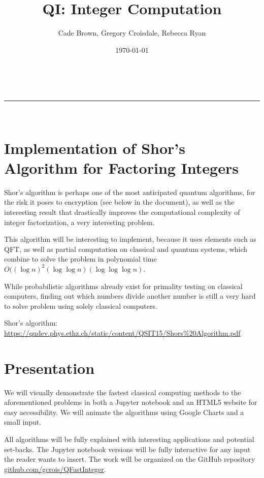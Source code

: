 \documentclass[a4paper,11pt]{article}
\makeatletter
\newcommand{\linia}{\rule{\linewidth}{0.5pt}}
\theoremstyle{mytheor}
\renewcommand{\maketitle}{
\begin{center}
\vspace{2ex}
{\huge \textsc{\@title}}
\vspace{1ex}
\\
\linia\\
\@author \hfill \@date
\vspace{4ex}
\end{center}
}
\makeatother
\begin{document}
\title{QI: Integer Computation}

\author{Cade Brown, Gregory Croisdale, Rebecca Ryan}

\date{\today}

\maketitle


\section*{Implementation of Shor's Algorithm for Factoring Integers}





Shor's algorithm is perhaps one of the most anticipated quantum algorithms, for the risk it poses to encryption (see below in the document), as well as the interesting result that drastically improves the computational complexity of integer factorization, a very interesting problem.

This algorithm will be interesting to implement, because it uses elements such as QFT, as well as partial computation on classical and quantum systems, which combine to solve the problem in polynomial time $O((\log n)^2(\log \log n)(\log \log \log n)$.

While probabilistic algorithms already exist for primality testing on classical computers, finding out which numbers divide another number is still a very hard to solve problem using solely classical computers.

Shor's algorithm: \href{https://qudev.phys.ethz.ch/static/content/QSIT15/Shors\%20Algorithm.pdf}{https://qudev.phys.ethz.ch/static/content/QSIT15/Shors\%20Algorithm.pdf}





\section*{Presentation}
We will visually demonstrate the fastest classical computing methods to the aforementioned problems in both a Jupyter notebook and an HTML5 website for easy accessibility. We will animate the algorithms using Google Charts and a small input.

All algorithms will be fully explained with interesting applications and potential set-backs. The Jupyter notebook versions will be fully interactive for any input the reader wants to insert. The work will be organized on the GitHub repository \href{https://github.com/gcrois/QFastInteger}{github.com/gcrois/QFastInteger}.
\end{document}
